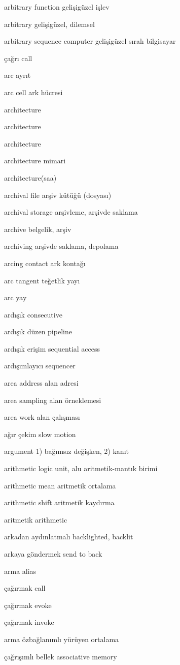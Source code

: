 \documentclass[12pt,fleqn]{article}\usepackage{../../common}
\begin{document}
arbitrary function gelişigüzel işlev

arbitrary gelişigüzel, dilemsel

arbitrary sequence computer gelişigüzel sıralı bilgisayar

çağrı call

arc ayrıt

arc cell ark hücresi

architecture

architecture

architecture

architecture mimari

architecture(saa)

archival file arşiv kütüğü (dosyası)

archival storage arşivleme, arşivde saklama

archive belgelik, arşiv

archiving arşivde saklama, depolama

arcing contact ark kontağı

arc tangent teğetlik yayı

arc yay

ardışık consecutive

ardışık düzen pipeline

ardışık erişim sequential access

ardışımlayıcı sequencer

area address alan adresi

area sampling alan örneklemesi

area work alan çalışması

ağır çekim slow motion

argument 1) bağımsız değişken, 2) kanıt

arithmetic logic unit, alu aritmetik-mantık birimi

arithmetic mean aritmetik ortalama

arithmetic shift aritmetik kaydırma

aritmetik arithmetic

arkadan aydınlatmalı backlighted, backlit

arkaya göndermek send to back

arma alias

çağırmak call

çağırmak evoke

çağırmak invoke

arma özbağlanımlı yürüyen ortalama

çağrışımlı bellek associative memory
\end{document}
